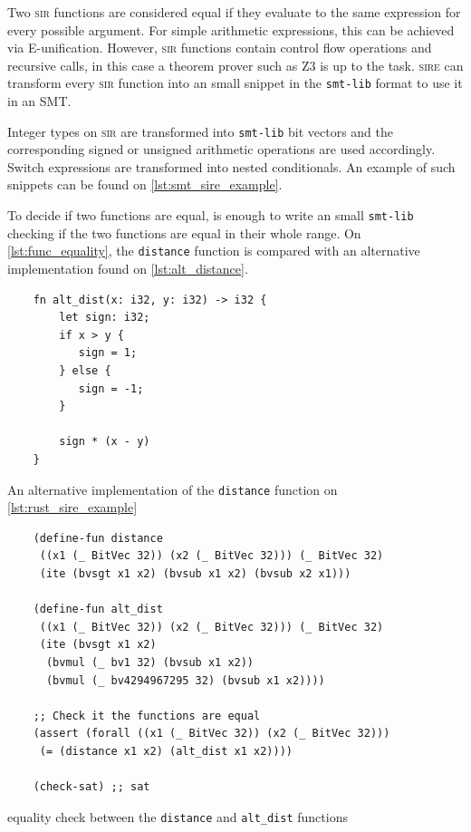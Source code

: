 Two \textsc{sir} functions are considered equal if they evaluate to the same
expression for every possible argument. For simple arithmetic expressions, this
can be achieved via E-unification. However, \textsc{sir} functions contain
control flow operations and recursive calls, in this case a theorem prover such
as Z3 is up to the task. \textsc{sire} can transform every \textsc{sir}
function into an small snippet in the \texttt{smt-lib} format to use it in an SMT.

Integer types on \textsc{sir} are transformed into \texttt{smt-lib} bit vectors
and the corresponding signed or unsigned arithmetic operations are used accordingly.
Switch expressions are transformed into nested conditionals. An example of such
snippets can be found on \ref{lst:smt_sire_example}. 

To decide if two functions are equal, is enough to write an small
\texttt{smt-lib} checking if the two functions are equal in their whole range. On \ref{lst:func_equality}, the \texttt{distance} function is compared with an alternative implementation found on \ref{lst:alt_distance}. 

\begin{listing}[ht]
    \begin{verbatim}
    fn alt_dist(x: i32, y: i32) -> i32 {
        let sign: i32; 
        if x > y {
           sign = 1;
        } else {
           sign = -1;
        }

        sign * (x - y)
    }
    \end{verbatim}
    \caption{An alternative implementation of the \texttt{distance} function on \ref{lst:rust_sire_example}}
  \label{lst:alt_distance}
\end{listing}

\begin{listing}[ht]
    \begin{verbatim}
    (define-fun distance 
     ((x1 (_ BitVec 32)) (x2 (_ BitVec 32))) (_ BitVec 32) 
     (ite (bvsgt x1 x2) (bvsub x1 x2) (bvsub x2 x1)))

    (define-fun alt_dist 
     ((x1 (_ BitVec 32)) (x2 (_ BitVec 32))) (_ BitVec 32) 
     (ite (bvsgt x1 x2) 
      (bvmul (_ bv1 32) (bvsub x1 x2)) 
      (bvmul (_ bv4294967295 32) (bvsub x1 x2))))
    
    ;; Check it the functions are equal
    (assert (forall ((x1 (_ BitVec 32)) (x2 (_ BitVec 32))) 
     (= (distance x1 x2) (alt_dist x1 x2)))) 

    (check-sat) ;; sat
    \end{verbatim}
    \caption{equality check between the \texttt{distance} and \texttt{alt\_dist} functions}
  \label{lst:func_equality}
\end{listing}

